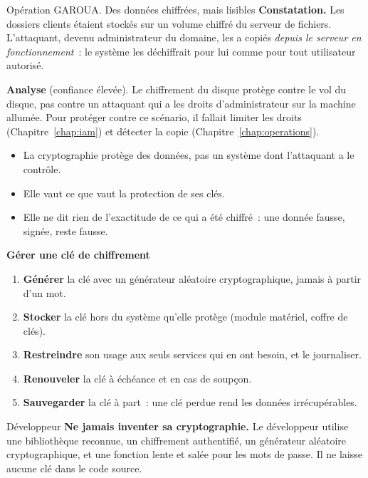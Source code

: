 \begin{boxscenario}{Opération GAROUA. Des données chiffrées, mais lisibles}
\textbf{Constatation.} Les dossiers clients étaient stockés sur un
volume chiffré du serveur de fichiers. L'attaquant, devenu administrateur
du domaine, les a copiés \emph{depuis le serveur en fonctionnement}~: le
système les déchiffrait pour lui comme pour tout utilisateur autorisé.

\medskip
\textbf{Analyse} (confiance élevée). Le chiffrement du disque protège
contre le vol du disque, pas contre un attaquant qui a les droits
d'administrateur sur la machine allumée. Pour protéger contre ce
scénario, il fallait limiter les droits (Chapitre~\ref{chap:iam}) et
détecter la copie (Chapitre~\ref{chap:operations}).
\end{boxscenario}

\begin{itemize}
    \item La cryptographie protège des données, pas un système dont
          l'attaquant a le contrôle.
    \item Elle vaut ce que vaut la protection de ses clés.
    \item Elle ne dit rien de l'exactitude de ce qui a été chiffré~: une
          donnée fausse, signée, reste fausse.
\end{itemize}

\begin{boxprocedure}
\textbf{Gérer une clé de chiffrement}
\begin{enumerate}
    \item \textbf{Générer} la clé avec un générateur aléatoire
          cryptographique, jamais à partir d'un mot.
    \item \textbf{Stocker} la clé hors du système qu'elle protège (module
          matériel, coffre de clés).
    \item \textbf{Restreindre} son usage aux seuls services qui en ont
          besoin, et le journaliser.
    \item \textbf{Renouveler} la clé à échéance et en cas de soupçon.
    \item \textbf{Sauvegarder} la clé à part~: une clé perdue rend les
          données irrécupérables.
\end{enumerate}
\end{boxprocedure}

\begin{boxmetier}{Développeur}
\textbf{Ne jamais inventer sa cryptographie.} Le développeur utilise une
bibliothèque reconnue, un chiffrement authentifié, un générateur
aléatoire cryptographique, et une fonction lente et salée pour les mots
de passe. Il ne laisse aucune clé dans le code source.
\end{boxmetier}

